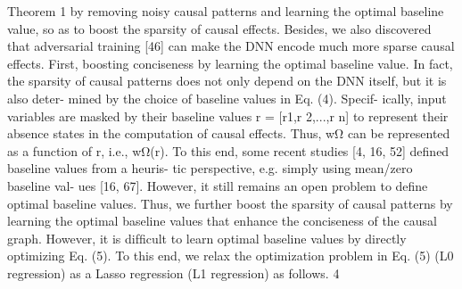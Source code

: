 Theorem 1 by removing noisy causal patterns and learning
the optimal baseline value, so as to boost the sparsity of
causal effects. Besides, we also discovered that adversarial
training [46] can make the DNN encode much more sparse
causal effects.
First, boosting conciseness by learning the optimal
baseline value. In fact, the sparsity of causal patterns does
not only depend on the DNN itself, but it is also deter-
mined by the choice of baseline values in Eq. (4). Specif-
ically, input variables are masked by their baseline values
r = [r1,r 2,...,r n] to represent their absence states in the
computation of causal effects. Thus, wΩ can be represented
as a function of r, i.e., wΩ(r). To this end, some recent
studies [4, 16, 52] deﬁned baseline values from a heuris-
tic perspective, e.g. simply using mean/zero baseline val-
ues [16, 67]. However, it still remains an open problem to
deﬁne optimal baseline values.
Thus, we further boost the sparsity of causal patterns
by learning the optimal baseline values that enhance the
conciseness of the causal graph. However, it is difﬁcult to
learn optimal baseline values by directly optimizing Eq. (5).
To this end, we relax the optimization problem in Eq. (5) (L0
regression) as a Lasso regression (L1 regression) as follows.
4
